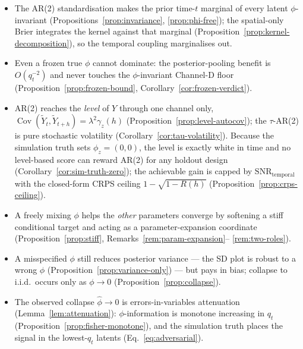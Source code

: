 \documentclass[11pt]{article}
\theoremstyle{definition}
\newcommand{\Cov}{\operatorname{Cov}}
\newcommand{\SNR}{\mathrm{SNR}_{\mathrm{temporal}}}
\begin{document}
\begin{itemize}[leftmargin=1.4em, itemsep=2pt]
  \item The AR(2) standardisation makes the prior time-$t$ marginal of
        every latent $\phi$-invariant
        (Propositions~\ref{prop:invariance}, \ref{prop:phi-free}); the
        spatial-only Brier integrates the kernel against that marginal
        (Proposition~\ref{prop:kernel-decomposition}), so the temporal
        coupling marginalises out.
  \item Even a frozen true $\phi$ cannot dominate: the posterior-pooling
        benefit is $O(q_t^{-2})$ and never touches the $\phi$-invariant
        Channel-D floor (Proposition~\ref{prop:frozen-bound},
        Corollary~\ref{cor:frozen-verdict}).
  \item AR(2) reaches the \emph{level} of $Y$ through one channel only,
        $\Cov(\widetilde Y_t,\widetilde Y_{t+h})=\lambda^2\gamma_z(h)$
        (Proposition~\ref{prop:level-autocov}); the $\tau$-AR(2) is
        pure stochastic volatility (Corollary~\ref{cor:tau-volatility}).
        Because the simulation truth sets $\phi_z=(0,0)$, the level is
        exactly white in time and no level-based score can reward AR(2)
        for any holdout design (Corollary~\ref{cor:sim-truth-zero});
        the achievable gain is capped by $\SNR$ with the closed-form
        CRPS ceiling $1-\sqrt{1-R(h)}$
        (Proposition~\ref{prop:crps-ceiling}).
  \item A freely mixing $\phi$ helps the \emph{other} parameters
        converge by softening a stiff conditional target and acting as
        a parameter-expansion coordinate
        (Proposition~\ref{prop:stiff}, Remarks~\ref{rem:param-expansion}--%
        \ref{rem:two-roles}).
  \item A misspecified $\phi$ still reduces posterior variance --- the
        SD plot is robust to a wrong $\phi$
        (Proposition~\ref{prop:variance-only}) --- but pays in bias;
        collapse to i.i.d.\ occurs only as $\phi \to 0$
        (Proposition~\ref{prop:collapse}).
  \item The observed collapse $\hat\phi \to 0$ is errors-in-variables
        attenuation (Lemma~\ref{lem:attenuation}): $\phi$-information
        is monotone increasing in $q_t$
        (Proposition~\ref{prop:fisher-monotone}), and the simulation
        truth places the signal in the lowest-$q_t$ latents
        (Eq.~\eqref{eq:adversarial}).
\end{itemize}
\end{document}
